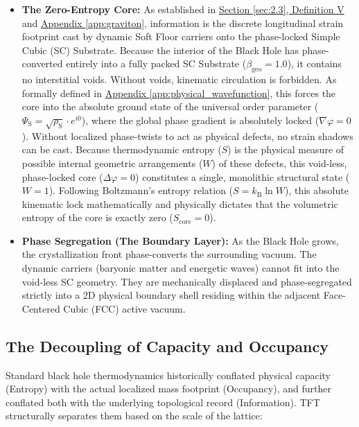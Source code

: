 \begin{itemize}
    \item \textbf{The Zero-Entropy Core:} As established in \hyperref[def:definition_five]{Section \ref*{sec:2.3}, Definition V} and \hyperref[app:graviton]{Appendix \ref*{app:graviton}}, information is the discrete longitudinal strain footprint cast by dynamic Soft Floor carriers onto the phase-locked Simple Cubic (SC) Substrate. Because the interior of the Black Hole has phase-converted entirely into a fully packed SC Substrate ($\beta_{\mathrm{geo}} = 1.0$), it contains no interstitial voids. Without voids, kinematic circulation is forbidden. As formally defined in \hyperref[app:physical_wavefunction]{Appendix \ref*{app:physical_wavefunction}}, this forces the core into the absolute ground state of the universal order parameter ($\Psi_{\mathrm{S}} = \sqrt{\rho_{\mathrm{S}}} \cdot e^{i0}$), where the global phase gradient is absolutely locked ($\nabla\varphi = 0$). Without localized phase-twists to act as physical defects, no strain shadows can be cast. Because thermodynamic entropy ($S$) is the physical measure of possible internal geometric arrangements ($W$) of these defects, this void-less, phase-locked core ($\Delta\varphi = 0$) constitutes a single, monolithic structural state ($W = 1$). Following Boltzmann's entropy relation ($S = k_{\mathrm{B}} \ln W$), this absolute kinematic lock mathematically and physically dictates that the volumetric entropy of the core is exactly zero ($S_{\mathrm{core}} = 0$).
    \item \textbf{Phase Segregation (The Boundary Layer):} As the Black Hole grows, the crystallization front phase-converts the surrounding vacuum. The dynamic carriers (baryonic matter and energetic waves) cannot fit into the void-less SC geometry. They are mechanically displaced and phase-segregated strictly into a 2D physical boundary shell residing within the adjacent Face-Centered Cubic (FCC) active vacuum.
\end{itemize}

\subsection{The Decoupling of Capacity and Occupancy}

Standard black hole thermodynamics historically conflated physical capacity (Entropy) with the actual localized mass footprint (Occupancy), and further conflated both with the underlying topological record (Information). TFT structurally separates them based on the scale of the lattice:

